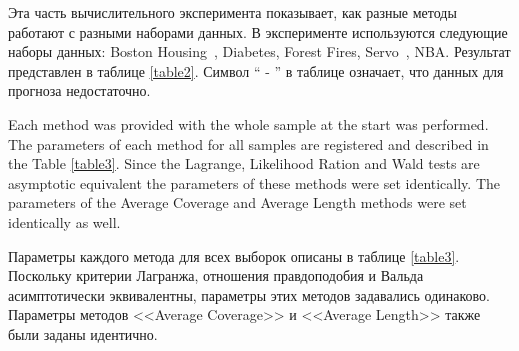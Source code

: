 Эта часть вычислительного эксперимента показывает, как разные методы работают с разными наборами данных. В эксперименте используются следующие наборы данных: Boston Housing~\cite{Boston}, Diabetes, Forest Fires, Servo~\cite{servo}, NBA.
Результат представлен в таблице \ref{table2}. Символ `` - '' в таблице означает, что данных для прогноза недостаточно.

Each method was provided with the whole sample at the start was performed. The parameters of each method for all samples are registered and described in the Table \ref{table3}. Since the Lagrange, Likelihood Ration and Wald tests are asymptotic equivalent the parameters of these methods were set identically. The parameters of the Average Coverage and Average Length methods were set identically as well.

Параметры каждого метода для всех выборок описаны в таблице \ref{table3}. Поскольку критерии Лагранжа, отношения правдоподобия и Вальда асимптотически эквивалентны, параметры этих методов задавались одинаково. Параметры методов <<Average Coverage>> и <<Average Length>> также были заданы идентично.

\begin{table}[h!]
\begin{center}
\caption{Экспертные оценки гиперпараметров для разных методов оценки объема выборки}
\label{table3}
\end{center}
\end{table}

